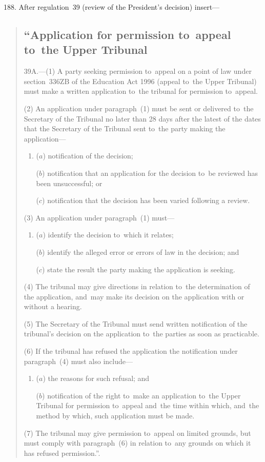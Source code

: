 \documentclass[12pt,a4paper]{article}
\begin{document}
188.  After regulation~39 (review of the President’s decision) insert—
\begin{quotation}
\subsection*{“Application for permission to~appeal to~the Upper Tribunal}

39A.---(1)  A party seeking permission to~appeal on a point of law under section~336ZB of the Education Act 1996 (appeal to~the Upper Tribunal) must make a written application to~the tribunal for permission to~appeal.

(2) An application under paragraph~(1) must be sent or delivered to~the Secretary of the Tribunal no later than 28 days after the latest of the dates that the Secretary of the Tribunal sent to~the party making the application—
\begin{enumerate}\item[]
($a$) notification of the decision;

($b$) notification that an application for the decision to~be reviewed has been unsuccessful; or

($c$) notification that the decision has been varied following a review.
\end{enumerate}

(3) An application under paragraph~(1) must—
\begin{enumerate}\item[]
($a$) identify the decision to~which it relates;

($b$) identify the alleged error or errors of law in the decision; and

($c$) state the result the party making the application is seeking.
\end{enumerate}

(4) The tribunal may give directions in relation to~the determination of the application, and~may make its decision on the application with or without a hearing.

(5) The Secretary of the Tribunal must send written notification of the tribunal’s decision on the application to~the parties as soon as practicable.

(6) If the tribunal has refused the application the notification under paragraph~(4) must also include—
\begin{enumerate}\item[]
($a$) the reasons for such refusal; and

($b$) notification of the right to~make an application to~the Upper Tribunal for permission to~appeal and~the time within which, and~the method by which, such application must be made.
\end{enumerate}

(7) The tribunal may give permission to~appeal on limited grounds, but must comply with paragraph~(6) in relation to~any grounds on which it has refused permission.”.
\end{quotation}
\end{document}
